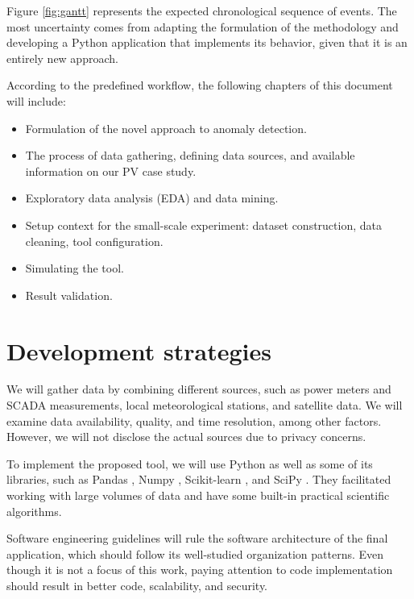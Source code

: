 Figure \ref{fig:gantt} represents the expected chronological sequence of events. The most uncertainty comes from adapting the formulation of the methodology and developing a Python application that implements its behavior, given that it is an entirely new approach.

According to the predefined workflow, the following chapters of this document will include:

\begin{itemize}
    \item Formulation of the novel approach to anomaly detection.
    \item The process of data gathering, defining data sources, and available information on our PV case study.
    \item Exploratory data analysis (EDA) and data mining.
    \item Setup context for the small-scale experiment: dataset construction, data cleaning, tool configuration.
    \item Simulating the tool.
    \item Result validation.
\end{itemize}

\section{Development strategies}

We will gather data by combining different sources, such as power meters and SCADA measurements, local meteorological stations, and satellite data. We will examine data availability, quality, and time resolution, among other factors. However, we will not disclose the actual sources due to privacy concerns.

To implement the proposed tool, we will use Python as well as some of its libraries, such as Pandas \cite{pandas}, Numpy \cite{numpy}, Scikit-learn \cite{sklearn}, and SciPy \cite{scipy}. They facilitated working with large volumes of data and have some built-in practical scientific algorithms. 

Software engineering guidelines will rule the software architecture of the final application, which should follow its well-studied organization patterns. Even though it is not a focus of this work, paying attention to code implementation should result in better code, scalability, and security.

